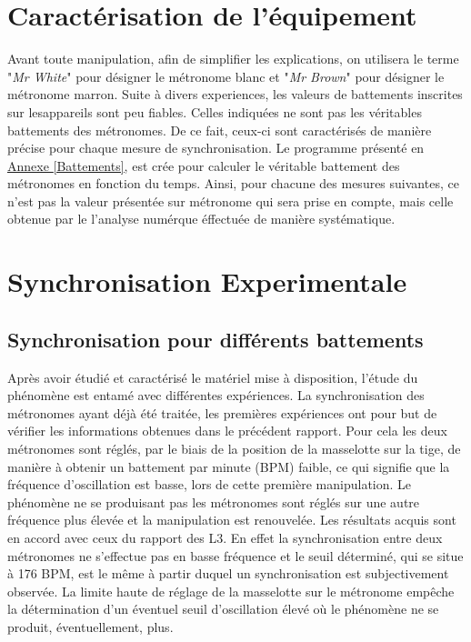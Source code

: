 \documentclass[a4paper,11pt]{report}
\begin{document}
\section{Caractérisation de l'équipement}
Avant toute manipulation, afin de simplifier les explications, on utilisera le terme "{\it Mr White}" pour désigner le métronome blanc et "{\it Mr Brown}" pour désigner le métronome marron. Suite à divers experiences, les valeurs de battements inscrites sur lesappareils sont peu fiables. Celles indiquées ne sont pas les véritables battements des métronomes. De ce fait, ceux-ci sont caractérisés de manière précise pour chaque mesure de synchronisation. Le programme présenté en \underline{Annexe \ref{Battements}}, est crée pour calculer le véritable battement des métronomes en fonction du temps. Ainsi, pour chacune des mesures suivantes, ce n'est pas la valeur présentée sur métronome qui sera prise en compte, mais celle obtenue par le l'analyse numérque éffectuée de manière systématique.

\section{Synchronisation Experimentale}

\subsection{Synchronisation pour différents battements}
Après avoir étudié et caractérisé le matériel mise à disposition, l'étude du phénomène est entamé avec différentes expériences. La synchronisation des métronomes ayant déjà été traitée, les premières expériences ont pour but de vérifier les informations obtenues dans le précédent rapport. Pour cela les deux métronomes sont réglés, par le biais de la position de la masselotte sur la tige, de manière à obtenir un battement par minute (BPM) faible, ce qui signifie que la fréquence d'oscillation est basse, lors de cette première manipulation. Le phénomène ne se produisant pas les métronomes sont réglés sur une autre fréquence plus élevée et la manipulation est renouvelée. Les résultats acquis sont en accord avec ceux du rapport des L3\cite{ram}. En effet la synchronisation entre deux métronomes ne s'effectue pas en basse fréquence et le seuil déterminé, qui se situe à 176 BPM, est le même à partir duquel un synchronisation est subjectivement observée. La limite haute de réglage de la masselotte sur le métronome empêche la détermination d'un éventuel seuil d'oscillation élevé où le phénomène ne se produit, éventuellement, plus.\\
\end{document}
